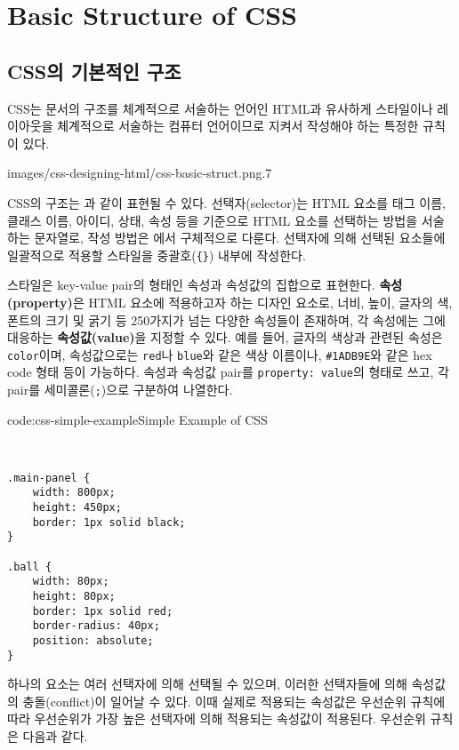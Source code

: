 \section{Basic Structure of CSS} \label{sect:basic-structure-of-css}

\subsection*{CSS의 기본적인 구조}

CSS는 문서의 구조를 체계적으로 서술하는 언어인 HTML과 유사하게 스타일이나 레이아웃을 체계적으로 서술하는 컴퓨터 언어이므로 지켜서 작성해야 하는 특정한 규칙이 있다.

    {images/css-designing-html/css-basic-struct.png}{.7}

CSS의 구조는 과 같이 표현될 수 있다. 선택자(selector)는 HTML 요소를 태그 이름, 클래스 이름, 아이디, 상태, 속성 등을 기준으로 HTML 요소를 선택하는 방법을 서술하는 문자열로, 작성 방법은 에서 구체적으로 다룬다. 선택자에 의해 선택된 요소들에 일괄적으로 적용할 스타일을 중괄호(\verb|{}|) 내부에 작성한다.

스타일은 key-value pair의 형태인 속성과 속성값의 집합으로 표현한다. \textbf{속성(property)}은 HTML 요소에 적용하고자 하는 디자인 요소로, 너비, 높이, 글자의 색, 폰트의 크기 및 굵기 등 250가지가 넘는 다양한 속성들이 존재하며, 각 속성에는 그에 대응하는 \textbf{속성값(value)}을 지정할 수 있다. 예를 들어, 글자의 색상과 관련된 속성은 \verb|color|이며, 속성값으로는 \verb|red|나 \verb|blue|와 같은 색상 이름이나, \verb|#1ADB9E|와 같은 hex code 형태 등이 가능하다. 속성과 속성값 pair를 \verb|property: value|의 형태로 쓰고, 각 pair를 세미콜론(\verb|;|)으로 구분하여 나열한다.

\begin{codeenv}{code:css-simple-example}{Simple Example of CSS}\begin{verbatim}


.main-panel {
    width: 800px;
    height: 450px;
    border: 1px solid black;
}

.ball {
    width: 80px;
    height: 80px;
    border: 1px solid red;
    border-radius: 40px;
    position: absolute;
}
\end{verbatim}
\end{codeenv}

하나의 요소는 여러 선택자에 의해 선택될 수 있으며, 이러한 선택자들에 의해 속성값의 충돌(conflict)이 일어날 수 있다. 이때 실제로 적용되는 속성값은 우선순위 규칙에 따라 우선순위가 가장 높은 선택자에 의해 적용되는 속성값이 적용된다. 우선순위 규칙은 다음과 같다.

